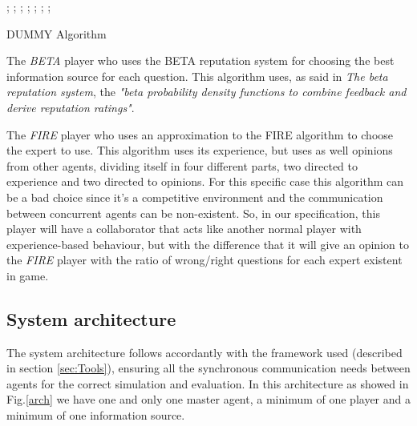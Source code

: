 \documentclass{llncs}
\begin{document}
\begin{algorithm}
\begin{algorithmic}[1]
    ;
 	\Else
    ;
    \EndIf
  \EndFunction
  	;
  	;
			;
			;
			\EndIf
    	\EndFor
    	\EndIf
    \EndFor
    ;
  \EndFunction
\end{algorithmic}
\caption{DUMMY Algorithm}\label{alg:dummy}
\end{algorithm}

The \textit{BETA} player who uses the BETA reputation system \cite{Beta} for choosing the best information source for each question. This algorithm uses, as said in \textit{The beta reputation system}, the \textit{"beta probability density functions to combine feedback and derive reputation ratings"}\cite{Beta}.

The \textit{FIRE} player who uses an approximation to the FIRE algorithm \cite{Fire} to choose the expert to use. This algorithm uses its experience, but uses as well opinions from other agents, dividing itself in four different parts, two directed to experience and two directed to opinions. For this specific case this algorithm can be a bad choice since it's a competitive environment and the communication between concurrent agents can be non-existent. So, in our specification, this player will have a collaborator that acts like another normal player with experience-based behaviour, but with the difference that it will give an opinion to the \textit{FIRE} player with the ratio of wrong/right questions for each expert existent in game.

\subsection{System architecture}\label{sec:Architecture}
The system architecture follows accordantly with the framework used (described in section \ref{sec:Tools}), ensuring all the synchronous communication needs between agents for the correct simulation and evaluation. In this architecture as showed in Fig.\ref{arch} we have one and only one master agent, a minimum of one player and a minimum of one information source. 
\end{document}
